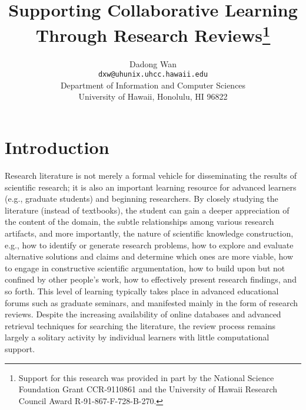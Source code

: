 
\title{Supporting Collaborative Learning Through Research
Reviews\thanks{Support for this research was provided in part by the
National Science Foundation Grant CCR-9110861 and the University of Hawaii
Research Council Award R-91-867-F-728-B-270.}} 
\author{Dadong Wan\\ 
{\tt dxw@uhunix.uhcc.hawaii.edu}\\
Department of Information and Computer Sciences\\ 
University of Hawaii, Honolulu, HI 96822}


\maketitle


\section{Introduction}

Research literature is not merely a formal vehicle for disseminating the
results of scientific research; it is also an important learning resource
for advanced learners (e.g., graduate students) and beginning researchers.
By closely studying the literature (instead of textbooks), the student can
gain a deeper appreciation of the content of the domain, the subtle
relationships among various research artifacts, and more importantly, the
nature of scientific knowledge construction, e.g., how to identify or
generate research problems, how to explore and evaluate alternative
solutions and claims and determine which ones are more viable, how to
engage in constructive scientific argumentation, how to build upon but not
confined by other people's work, how to effectively present research
findings, and so forth.  This level of learning typically takes place in
advanced educational forums such as graduate seminars, and manifested
mainly in the form of research reviews. Despite the increasing availability
of online databases and advanced retrieval techniques for searching the
literature, the review process remains largely a solitary activity by
individual learners with little computational support.

